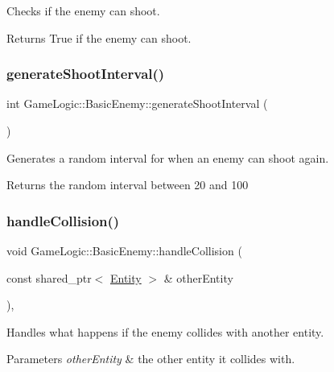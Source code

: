 Checks if the enemy can shoot. \begin{DoxyReturn}{Returns}
True if the enemy can shoot. 
\end{DoxyReturn}
\mbox{\label{classGameLogic_1_1BasicEnemy_adec32036fbf44534988bcbc850a3e3a5}} 
\subsubsection{\texorpdfstring{generate\+Shoot\+Interval()}{generateShootInterval()}}
{\footnotesize\ttfamily int Game\+Logic\+::\+Basic\+Enemy\+::generate\+Shoot\+Interval (\begin{DoxyParamCaption}{ }\end{DoxyParamCaption})}

Generates a random interval for when an enemy can shoot again. \begin{DoxyReturn}{Returns}
the random interval between 20 and 100 
\end{DoxyReturn}
\mbox{\label{classGameLogic_1_1BasicEnemy_a3d01ac4181b0aaa6058d434195e68830}} 
\subsubsection{\texorpdfstring{handle\+Collision()}{handleCollision()}}
{\footnotesize\ttfamily void Game\+Logic\+::\+Basic\+Enemy\+::handle\+Collision (\begin{DoxyParamCaption}\item[{const shared\+\_\+ptr$<$ \hyperlink{classGameLogic_1_1Entity}{Entity} $>$ \&}]{other\+Entity }\end{DoxyParamCaption})\hspace{0.3cm}{\ttfamily [override]}, {\ttfamily [virtual]}}

Handles what happens if the enemy collides with another entity. 
\begin{DoxyParams}{Parameters}
{\em other\+Entity} & the other entity it collides with. \\
\hline
\end{DoxyParams}


